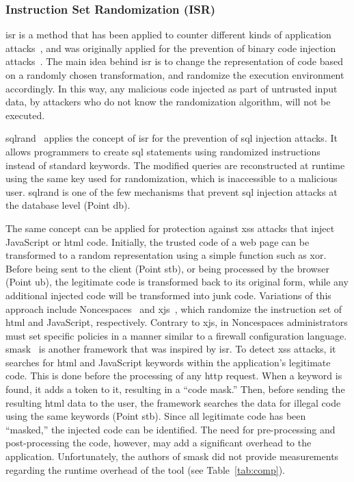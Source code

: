 \documentclass[10pt,journal,compsoc]{IEEEtran}
\begin{document}
\vspace{-0.3mm}
\subsubsection{Instruction Set Randomization (ISR)}
\vspace{-0.8mm}

{\sc isr} is a method that has been applied to counter different kinds
of application attacks~\cite{K09b}, and was originally applied for the
prevention of binary code injection attacks~\cite{KKP03}.
The main idea behind {\sc isr} is
to change the representation of code
based on a randomly chosen transformation,
and randomize the execution environment accordingly.
In this way, any malicious code injected as part of untrusted input data,
by attackers who do not know the randomization algorithm,
will not be executed.

{\sc sql}rand~\cite{BK04} applies the concept of {\sc isr} for the prevention
of {\sc sql} injection attacks. It allows programmers to create {\sc sql}
statements using randomized instructions instead of standard keywords.
The modified queries are reconstructed at runtime using the same key
used for randomization, which is inaccessible to a malicious user.
{\sc sql}rand is one of the few mechanisms that prevent {\sc sql}
injection attacks at the database level (Point {\sc db}).

The same concept can be applied for protection against
{\sc xss} attacks that inject JavaScript or {\sc html} code.
Initially, the trusted code of a web page can be transformed
to a random representation using a simple function such as {\sc xor}.
Before being sent to the client (Point {\sc s}t{\sc b}),
or being processed by the browser (Point {\sc ub}),
the legitimate code is transformed back to its original form,
while any additional injected code will be transformed into junk code.
Variations of this approach include
Noncespaces~\cite{GC09} and x{\sc js}~\cite{APKLM10}, which
randomize the instruction set of {\sc html} and JavaScript,
respectively. Contrary to x{\sc js}, in Noncespaces administrators
must set specific policies in a manner similar to a firewall
configuration language. {\sc sm}ask~\cite{JB07} is another
framework that was inspired by {\sc isr}. To detect {\sc xss}
attacks, it searches for {\sc html} and
JavaScript keywords within the application's legitimate code. This is
done before the processing of any {\sc http} request. When a keyword is found,
it adds a token to it, resulting in a ``code mask.'' Then, before
sending the resulting {\sc html} data to the user, the framework
searches the data for illegal code using the same keywords (Point
{\sc s}t{\sc b}). Since all legitimate code has been ``masked,'' the injected
code can be identified. The need for 
pre-processing and post-processing the code,
however, may add a significant overhead to the application.
Unfortunately, the authors of {\sc sm}ask did not provide measurements
regarding the runtime overhead of the tool (see
Table~\ref{tab:comp}).
\end{document}
